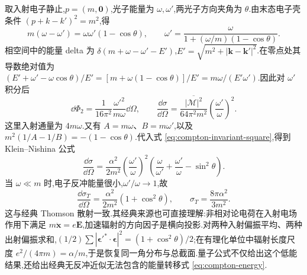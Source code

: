 取入射电子静止,$p=(m,\mathbf0)$,光子能量为 $\omega,\omega'$,两光子方向夹角为 $\theta$.由末态电子壳条件
$(p+k-k')^2=m^2$,得
\begin{equation}
 m(\omega-\omega')=\omega\omega'(1-\cos\theta),
 \qquad \omega'=\frac{\omega}{1+(\omega/m)(1-\cos\theta)}.
 \label{eq:compton-energy}
\end{equation}
相空间中的能量 delta 为 $\delta(m+\omega-\omega'-E')$,$E'=\sqrt{m^2+|\mathbf k-\mathbf k'|^2}$.在零点处其导数绝对值为
$(E'+\omega'-\omega\cos\theta)/E'=[m+\omega(1-\cos\theta)]/E'=m\omega/(E'\omega')$.因此对 $\omega'$ 积分后
\begin{equation}
 \dd\Phi_2=\frac1{16\pi^2}\frac{\omega'^2}{m\omega}\dd\Omega,
 \qquad
 \frac{\dd\sigma}{\dd\Omega}
 =\frac{\overline{|\mathcal M|^2}}{64\pi^2m^2}
 \left(\frac{\omega'}\omega\right)^2.
\end{equation}
这里入射通量为 $4m\omega$.又有 $A=m\omega$、$B=m\omega'$,以及 $m^2(1/A-1/B)=-(1-\cos\theta)$.代入式 \eqref{eq:compton-invariant-square},得到 Klein--Nishina 公式
\begin{equation}
 \frac{\dd\sigma}{\dd\Omega}
 =\frac{\alpha^2}{2m^2}\left(\frac{\omega'}\omega\right)^2
 \left(\frac\omega{\omega'}+\frac{\omega'}\omega-\sin^2\theta\right).
\end{equation}
当 $\omega\ll m$ 时,电子反冲能量很小,$\omega'/\omega\to1$,故
\begin{equation}
 \frac{\dd\sigma_T}{\dd\Omega}
 =\frac{\alpha^2}{2m^2}(1+\cos^2\theta),
 \qquad\sigma_T=\frac{8\pi\alpha^2}{3m^2}.
\end{equation}
这与经典 Thomson 散射一致.其经典来源也可直接理解:非相对论电荷在入射电场作用下满足 $m\ddot{\mathbf x}=e\mathbf E$,加速辐射的方向因子是横向投影.对两种入射偏振平均、两种出射偏振求和,$(1/2)\sum|\boldsymbol\epsilon'^*\cdot\boldsymbol\epsilon|^2=(1+\cos^2\theta)/2$;在有理化单位中辐射长度尺度 $e^2/(4\pi m)=\alpha/m$,于是恢复同一角分布与总截面.量子公式不仅给出这个低能结果,还给出经典无反冲近似无法包含的能量转移式 \eqref{eq:compton-energy}.
